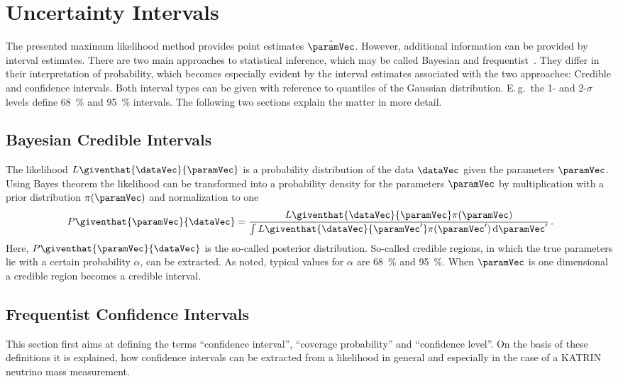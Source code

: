 \section{Uncertainty Intervals}
\label{sec:statMethodsUncertaintyIntervals}
The presented maximum likelihood method provides point estimates $\hat{\paramVec}$. However, additional information can be provided by interval estimates. There are two main approaches to statistical inference, which may be called Bayesian and frequentist~\cite{ReviewOfParticlePhysics}. They differ in their interpretation of probability, which becomes especially evident by the interval estimates associated with the two approaches: Credible and confidence intervals. Both interval types can be given with reference to quantiles of the Gaussian distribution. E.\,g.~the 1- and 2-$\sigma$ levels define \SI{68}{\percent} and \SI{95}{\percent} intervals. The following two sections explain the matter in more detail.

\subsection{Bayesian Credible Intervals}
The likelihood $L\giventhat{\dataVec}{\paramVec}$ is a probability distribution of the data $\dataVec$ given the parameters $\paramVec$. Using Bayes theorem the likelihood can be transformed into a probability density for the parameters $\paramVec$ by multiplication with a prior distribution $\pi(\paramVec)$ and normalization to one~\cite{ReviewOfParticlePhysics}
\begin{equation}
\label{eq:statMethodsPosterior}
	P\giventhat{\paramVec}{\dataVec} = 
		\frac{
			L\giventhat{\dataVec}{\paramVec}\pi(\paramVec)
		}{
			\int L\giventhat{\dataVec}{\paramVec^\prime}\pi(\paramVec^\prime) \d\paramVec^\prime
		}
	\fullstop
\end{equation}
Here, $P\giventhat{\paramVec}{\dataVec}$ is the so-called posterior distribution. So-called credible regions, in which the true parameters lie with a certain probability $\alpha$, can be extracted. As noted, typical values for $\alpha$ are \SI{68}{\percent} and \SI{95}{\percent}. When $\paramVec$ is one dimensional a credible region becomes a credible interval. 

\subsection{Frequentist Confidence Intervals}
\label{sec:statMethodsUncertaintyIntervalsConfidence}
This section first aims at defining the terms ``confidence interval'', ``coverage probability'' and ``confidence level''. On the basis of these definitions it is explained, how confidence intervals can be extracted from a likelihood in general and especially in the case of a KATRIN neutrino mass measurement.

